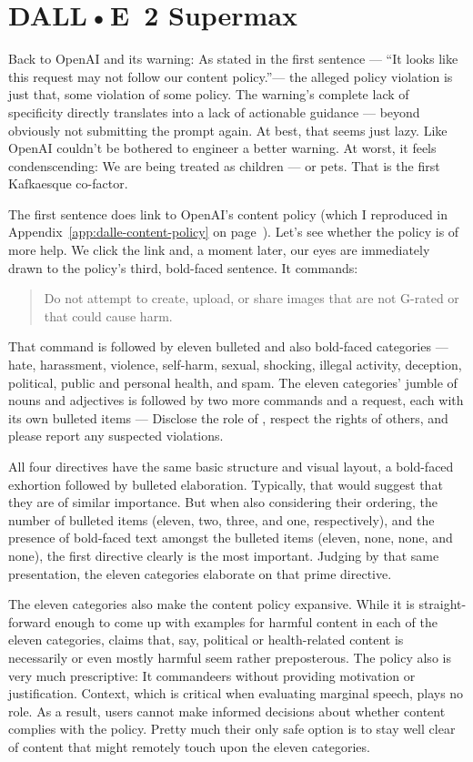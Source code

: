 \section{DALL•E~2 Supermax}
\label{sec:dalle}

Back to OpenAI and its warning: As stated in the first sentence --- ``It looks
like this request may not follow our content policy.''--- the alleged policy
violation is just that, some violation of some policy. The warning's complete
lack of specificity directly translates into a lack of actionable guidance —
beyond obviously not submitting the prompt again. At best, that seems just lazy.
Like OpenAI couldn't be bothered to engineer a better warning. At worst, it
feels condenscending: We are being treated as children --- or pets. That is the
first Kafkaesque co-factor.

The first sentence does link to OpenAI's content policy (which I reproduced in
Appendix~\ref{app:dalle-content-policy} on
page~\pageref{app:dalle-content-policy}). Let's see whether the policy is of
more help. We click the link and, a moment later, our eyes are immediately drawn
to the policy's third, bold-faced sentence. It commands:

\begin{quote}
\openfat{}Do not attempt to create, upload, or share images that are not
G-rated or that could cause harm.\closefat{}
\end{quote}

\noindent{}That command is followed by eleven bulleted and also bold-faced
categories — hate, harassment, violence, self-harm, sexual, shocking, illegal
activity, deception, political, public and personal health, and spam. The eleven
categories' jumble of nouns and adjectives is followed by two more commands and
a request, each with its own bulleted items — Disclose the role of \AI, respect
the rights of others, and please report any suspected violations.

All four directives have the same basic structure and visual layout, a
bold-faced exhortion followed by bulleted elaboration. Typically, that would
suggest that they are of similar importance. But when also considering their
ordering, the number of bulleted items (eleven, two, three, and one,
respectively), and the presence of bold-faced text amongst the bulleted items
(eleven, none, none, and none), the first directive clearly is the most
important. Judging by that same presentation, the eleven categories elaborate on
that prime directive.

The eleven categories also make the content policy expansive. While it is
straight-forward enough to come up with examples for harmful content in each of
the eleven categories, claims that, say, political or health-related content is
necessarily or even mostly harmful seem rather preposterous. The policy also is
very much prescriptive: It commandeers without providing motivation or
justification. Context, which is critical when evaluating marginal speech, plays
no role. As a result, users cannot make informed decisions about whether content
complies with the policy. Pretty much their only safe option is to stay well
clear of content that might remotely touch upon the eleven categories.

